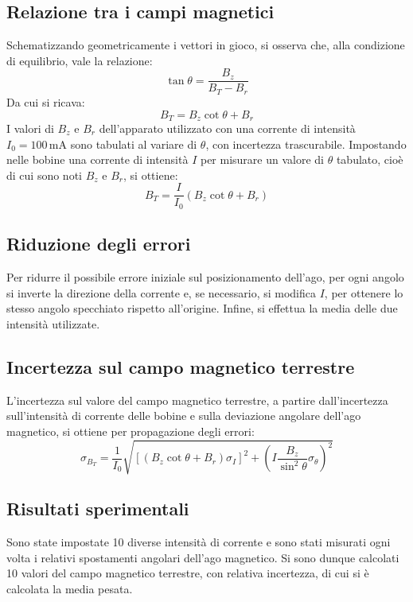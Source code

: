 \documentclass[a4paper,12pt]{article}
\begin{document}
\subsection{Relazione tra i campi magnetici}
Schematizzando geometricamente i vettori in gioco, si osserva che, alla condizione di equilibrio, vale la relazione:
\begin{equation}
    \tan \theta = \frac{B_z}{B_T - B_r}
    \label{eq:tan_theta}
\end{equation}
Da cui si ricava:
\begin{equation}
    B_T = B_z \cot \theta + B_r
    \label{eq:BT_formula}
\end{equation}
I valori di \( B_z \) e \( B_r \) dell’apparato utilizzato con una corrente di intensità \( I_0 = 100 \, \text{mA} \) sono tabulati al variare di \( \theta \), con incertezza trascurabile.
Impostando nelle bobine una corrente di intensità \( I \) per misurare un valore di \( \theta \) tabulato, cioè di cui sono noti \( B_z \) e \( B_r \), si ottiene:
\begin{equation}
    B_T = \frac{I}{I_0} \left( B_z \cot \theta + B_r \right)
    \label{eq:BT_with_I}
\end{equation}

\subsection{Riduzione degli errori}
Per ridurre il possibile errore iniziale sul posizionamento dell’ago, per ogni angolo si inverte la direzione della corrente e, se necessario, si modifica \( I \), per ottenere lo stesso angolo specchiato rispetto all’origine. Infine, si effettua la media delle due intensità utilizzate.

\subsection{Incertezza sul campo magnetico terrestre}
L’incertezza sul valore del campo magnetico terrestre, a partire dall’incertezza sull’intensità di corrente delle bobine e sulla deviazione angolare dell’ago magnetico, si ottiene per propagazione degli errori:
\begin{equation}
    \sigma_{B_T} = \frac{1}{I_0} \sqrt{\left[ \left( B_z \cot \theta + B_r \right) \sigma_I \right]^2 + \left( I \frac{B_z}{\sin^2 \theta} \sigma_\theta \right)^2}
    \label{eq:sigma_BT}
\end{equation}

\subsection{Risultati sperimentali}
Sono state impostate 10 diverse intensità di corrente e sono stati misurati ogni volta i relativi spostamenti angolari dell’ago magnetico. Si sono dunque calcolati 10 valori del campo magnetico terrestre, con relativa incertezza, di cui si è calcolata la media pesata.
\end{document}
